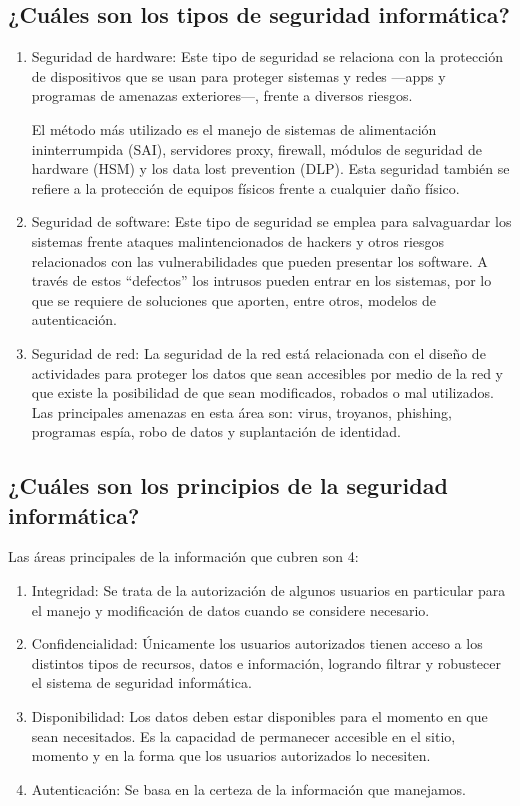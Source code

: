 \documentclass[12pt]{article}
\begin{document}
\subsection*{¿Cuáles son los tipos de seguridad informática?}
\begin{enumerate}
    \item Seguridad de hardware: Este tipo de seguridad se relaciona con la protección de dispositivos que se usan para proteger sistemas y redes —apps y programas de amenazas exteriores—, frente a diversos riesgos.

    El método más utilizado es el manejo de sistemas de alimentación ininterrumpida (SAI), servidores proxy, firewall, módulos de seguridad de hardware (HSM) y los data lost prevention (DLP). Esta seguridad también se refiere a la protección de equipos físicos frente a cualquier daño físico.

    \item Seguridad de software: Este tipo de seguridad se emplea para salvaguardar los sistemas frente ataques malintencionados de hackers y otros riesgos relacionados con las vulnerabilidades que pueden presentar los software. A través de estos “defectos” los intrusos pueden entrar en los sistemas, por lo que se requiere de soluciones que aporten, entre otros, modelos de autenticación.
    
    \item Seguridad de red: La seguridad de la red está relacionada con el diseño de actividades para proteger los datos que sean accesibles por medio de la red y que existe la posibilidad de que sean modificados, robados o mal utilizados. Las principales amenazas en esta área son: virus, troyanos, phishing, programas espía, robo de datos y suplantación de identidad.

\end{enumerate}

\subsection*{¿Cuáles son los principios de la seguridad informática?}
Las áreas principales de la información que cubren son 4:
\begin{enumerate}
\item Integridad: Se trata de la autorización de algunos usuarios en particular para el manejo y modificación de datos cuando se considere necesario.

\item Confidencialidad: Únicamente los usuarios autorizados tienen acceso a los distintos tipos de recursos, datos e información, logrando filtrar y robustecer el sistema de seguridad informática.

\item Disponibilidad: Los datos deben estar disponibles para el momento en que sean necesitados. Es la capacidad de permanecer accesible en el sitio, momento y en la forma que los usuarios autorizados lo necesiten.

\item Autenticación: Se basa en la certeza de la información que manejamos.

\end{enumerate}
\end{document}
